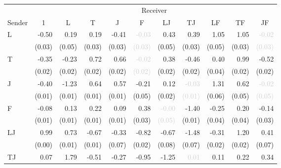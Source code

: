 \begin{tabular}{lrrrrrrrrrr}
\toprule
& \multicolumn{10}{c}{Receiver} \\
\cmidrule(l){2-11} 
Sender & \multicolumn{1}{c}{1} & \multicolumn{1}{c}{L} & \multicolumn{1}{c}{T} & \multicolumn{1}{c}{J} & \multicolumn{1}{c}{F} & \multicolumn{1}{c}{LJ} & \multicolumn{1}{c}{TJ} & \multicolumn{1}{c}{LF} & \multicolumn{1}{c}{TF} & \multicolumn{1}{c}{JF} \\
\midrule
\multirow{2}{*}{L} &-0.50 &\cellcolor{Gray}0.19 &0.19 &-0.41 &\textcolor{LightGray}{-0.03} &0.43 &0.39 &1.05 &1.05 &\textcolor{LightGray}{-0.02}\\
 &\tiny{(0.03)} &\cellcolor{Gray}\tiny{(0.05)} &\tiny{(0.03)} &\tiny{(0.03)} &\textcolor{LightGray}{\tiny{(0.03)}} &\tiny{(0.05)} &\tiny{(0.03)} &\tiny{(0.05)} &\tiny{(0.03)} &\textcolor{LightGray}{\tiny{(0.03)}}\\[1ex]
\multirow{2}{*}{T} &-0.35 &-0.23 &\cellcolor{Gray}0.72 &0.66 &\textcolor{LightGray}{-0.02} &0.38 &-0.46 &0.40 &0.99 &-0.52\\
 &\tiny{(0.02)} &\tiny{(0.02)} &\cellcolor{Gray}\tiny{(0.02)} &\tiny{(0.02)} &\textcolor{LightGray}{\tiny{(0.02)}} &\tiny{(0.02)} &\tiny{(0.02)} &\tiny{(0.04)} &\tiny{(0.02)} &\tiny{(0.02)}\\[1ex]
\multirow{2}{*}{J} &-0.40 &-1.23 &0.64 &\cellcolor{Gray}0.57 &-0.21 &0.12 &\textcolor{LightGray}{-0.03} &1.31 &0.62 &\textcolor{LightGray}{-0.02}\\
 &\tiny{(0.01)} &\tiny{(0.01)} &\tiny{(0.01)} &\cellcolor{Gray}\tiny{(0.01)} &\tiny{(0.05)} &\tiny{(0.02)} &\textcolor{LightGray}{\tiny{(0.01)}} &\tiny{(0.06)} &\tiny{(0.05)} &\textcolor{LightGray}{\tiny{(0.05)}}\\[1ex]
\multirow{2}{*}{F} &-0.08 &0.13 &0.22 &0.09 &\cellcolor{Gray}0.38 &\textcolor{LightGray}{-0.00} &-1.40 &-0.25 &0.20 &-0.14\\
 &\tiny{(0.01)} &\tiny{(0.01)} &\tiny{(0.01)} &\tiny{(0.01)} &\cellcolor{Gray}\tiny{(0.03)} &\textcolor{LightGray}{\tiny{(0.05)}} &\tiny{(0.01)} &\tiny{(0.04)} &\tiny{(0.04)} &\tiny{(0.03)}\\[1ex]
\multirow{2}{*}{LJ} &0.99 &0.73 &-0.67 &-0.33 &-0.82 &\cellcolor{Gray}-0.67 &-1.48 &-0.31 &1.20 &0.41\\
 &\tiny{(0.00)} &\tiny{(0.01)} &\tiny{(0.01)} &\tiny{(0.07)} &\tiny{(0.02)} &\cellcolor{Gray}\tiny{(0.08)} &\tiny{(0.07)} &\tiny{(0.02)} &\tiny{(0.02)} &\tiny{(0.07)}\\[1ex]
\multirow{2}{*}{TJ} &0.07 &1.79 &-0.51 &-0.27 &-0.95 &-1.25 &\cellcolor{Gray}\textcolor{LightGray}{0.01} &0.11 &0.22 &0.34\\

\end{tabular}
